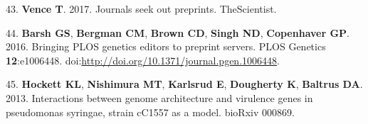 \documentclass[11pt,]{article}
\begin{document}
43. \textbf{Vence T}. 2017. Journals seek out preprints. TheScientist.

44. \textbf{Barsh GS}, \textbf{Bergman CM}, \textbf{Brown CD},
\textbf{Singh ND}, \textbf{Copenhaver GP}. 2016. Bringing PLOS genetics
editors to preprint servers. PLOS Genetics \textbf{12}:e1006448.
doi:\url{http://doi.org/10.1371/journal.pgen.1006448}.

45. \textbf{Hockett KL}, \textbf{Nishimura MT}, \textbf{Karlsrud E},
\textbf{Dougherty K}, \textbf{Baltrus DA}. 2013. Interactions between
genome architecture and virulence genes in pseudomonas syringae, strain
cC1557 as a model. bioRxiv 000869.
\end{document}
